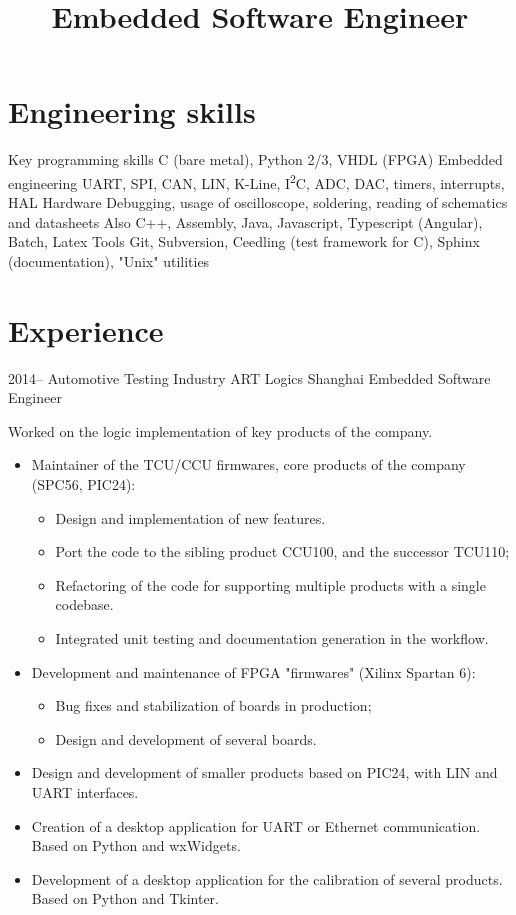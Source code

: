 \documentclass[11pt,a4paper,sans]{moderncv}        %
\title{Embedded Software Engineer}
\begin{document}
\makecvtitle

\section{Engineering skills}
\cvitem
  {Key programming skills}
  {C (bare metal), Python 2/3, VHDL (FPGA)}
\cvitem
  {Embedded engineering}
  {UART, SPI, CAN, LIN, K-Line, I\textsuperscript{2}C, ADC, DAC, timers, interrupts, HAL}
\cvitem
  {Hardware}
  {Debugging, usage of oscilloscope, soldering, reading of schematics and datasheets}
\cvitem
  {Also}
  {C++, Assembly, Java, Javascript, Typescript (Angular), Batch, Latex}
\cvitem
  {Tools}
  {Git, Subversion, Ceedling (test framework for C), Sphinx (documentation), "Unix" utilities}

\section{Experience}
\cventry
  {2014--\the\year}
  {Automotive Testing Industry}
  {ART Logics}
  {Shanghai}
  {Embedded Software Engineer}
  {
    Worked on the logic implementation of key products of the company.
    \begin{itemize}%
    \item Maintainer of the TCU/CCU firmwares, core products of the company (SPC56, PIC24):
      \begin{itemize}%
      \item Design and implementation of new features.
      \item Port the code to the sibling product CCU100, and the successor TCU110;
      \item Refactoring of the code for supporting multiple products with a single codebase.
      \item Integrated unit testing and documentation generation in the workflow.
      \end{itemize}
    \item Development and maintenance of FPGA "firmwares" (Xilinx Spartan 6):
      \begin{itemize}%
      \item Bug fixes and stabilization of boards in production;
      \item Design and development of several boards.
      \end{itemize}
    \item Design and development of smaller products based on PIC24, with LIN and UART interfaces.
    \item Creation of a desktop application for UART or Ethernet communication. Based on Python and wxWidgets.
    \item Development of a desktop application for the calibration of several products. Based on Python and Tkinter.
    \end{itemize}
  }
\end{document}
